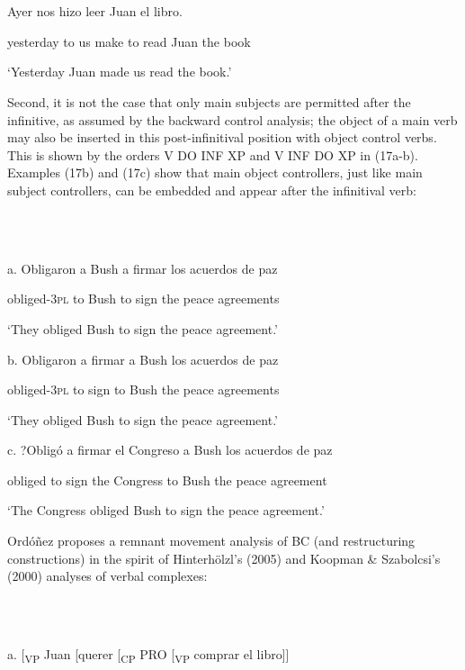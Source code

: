 \documentclass[output=paper]{langsci/langscibook}
\begin{document}
\ea%
    \label{ex:key:16}
    \gll\\
        \\
    \glt
    \z

           Ayer     nos   hizo   leer   Juan   el libro.

  yesterday   to us   make   to read Juan   the book

  ‘Yesterday Juan made us read the book.’

Second, it is not the case that only main subjects are permitted after the infinitive, as assumed by the backward control analysis; the object of a main verb may also be inserted in this post-infinitival position with object control verbs. This is shown by the orders V DO INF XP and V INF DO XP in (17a-b). Examples (17b) and (17c) show that main object controllers, just like main subject controllers, can be embedded and appear after the infinitival verb:

\ea%
    \label{ex:key:17}
    \gll\\
        \\
    \glt
    \z

           a.   Obligaron   a Bush   a firmar   los acuerdos de paz

    obliged-\textsc{3pl}  to Bush   to sign   the peace agreements

    ‘They obliged Bush to sign the peace agreement.’

  b.   Obligaron   a firmar   a Bush   los acuerdos de paz

    obliged-\textsc{3pl}   to sign     to Bush   the peace agreements

    ‘They obliged Bush to sign the peace agreement.’

  c.  ?Obligó   a firmar   el Congreso   a Bush   los acuerdos de paz

    obliged   to sign   the Congress to Bush   the peace agreement

    ‘The Congress obliged Bush to sign the peace agreement.’

Ordóñez proposes a remnant movement analysis of BC (and restructuring constructions) in the spirit of Hinterhölzl’s (2005) and Koopman \& Szabolcsi’s (2000) analyses of verbal complexes:

\ea%
    \label{ex:key:18}
    \gll\\
        \\
    \glt
    \z

          a.  [\textsubscript{VP} Juan [querer [\textsubscript{CP} PRO [\textsubscript{VP} comprar el libro]]
\end{document}
